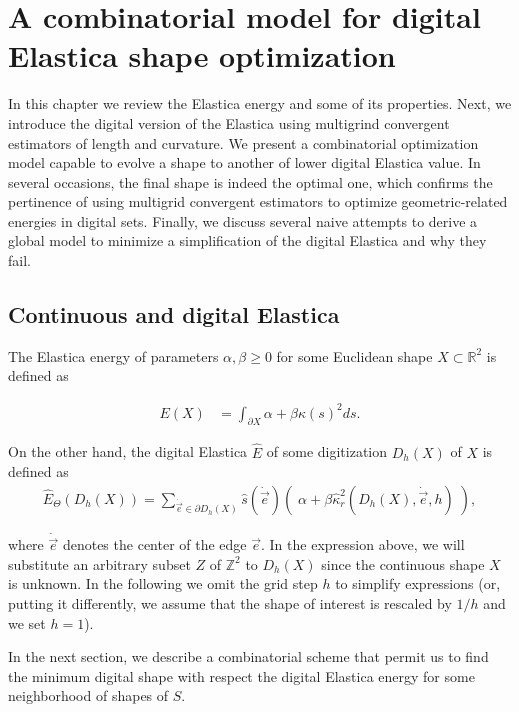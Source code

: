 \chapter{A combinatorial model for digital Elastica shape optimization}
\label{chapter:digital-elastica}

In this chapter we review the Elastica energy and some of its properties. Next, we introduce the digital version of the Elastica using multigrind convergent estimators of length and curvature. We present a combinatorial optimization model capable to evolve a shape to another of lower digital Elastica value. In several occasions, the final shape is indeed the optimal one, which confirms the pertinence of using multigrid convergent estimators to optimize geometric-related energies in digital sets. Finally, we discuss several naive attempts to derive a global model to minimize a simplification of the digital Elastica and why they fail.

\section{Continuous and digital Elastica}
\label{ch6:sec:continuous-digital-elastica}

	The Elastica energy of parameters $\alpha, \beta \geq 0$ for some Euclidean shape $X \subset \mathbb{R}^2$ is defined as
	
	\begin{align*}
	E(X) &= \int_{\partial X}{ \alpha + \beta \kappa(s)^2 ds}.
	\end{align*}
	
	
On the other hand, the digital Elastica $\hat{E}$ of some digitization $D_h(X)$ of $X$ is defined as
	\begin{align}
	\hat{E}_{\Theta}( D_h(X) ) = \sum_{\dot{\vec{e}} \in \partial D_h(X)}{ \hat{s}( \dot{\vec{e}})\left(\; \alpha + \beta \hat{\kappa}_{r}^2(D_h(X),\dot{\vec{e}},h) \; \right)},
	\label{eq:digital-elastica}
	\end{align}
	
where $\dot{\vec{e}}$ denotes the center of the edge $\vec{e}$. In the
expression above, we will substitute an arbitrary subset $Z$ of
$\mathbb{Z}^2$ to $D_h(X)$ since the continuous shape $X$ is unknown.
In the following we omit the grid step $h$ to simplify expressions
(or, putting it differently, we assume that the shape of interest is
rescaled by $1/h$ and we set $h=1$). 

In the next section, we describe a combinatorial scheme that permit us to find the minimum digital shape with respect the digital Elastica energy for some neighborhood of shapes of $S$. 

